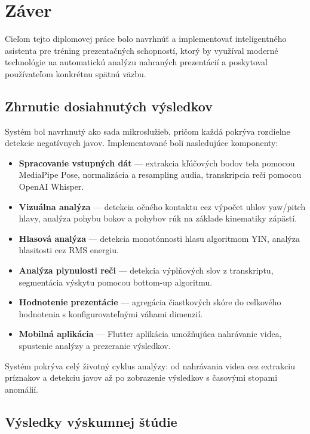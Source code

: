 \chapter{Záver}
\pagestyle{plain}

Cieľom tejto diplomovej práce bolo navrhnúť a implementovať inteligentného asistenta pre tréning prezentačných schopností, ktorý by využíval moderné technológie na automatickú analýzu nahraných prezentácií a poskytoval používateľom konkrétnu spätnú väzbu.

\section{Zhrnutie dosiahnutých výsledkov}

Systém bol navrhnutý ako sada mikroslužieb, pričom každá pokrýva rozdielne detekcie negatívnych javov. Implementované boli nasledujúce komponenty:

\begin{itemize}
    \item \textbf{Spracovanie vstupných dát} --- extrakcia kľúčových bodov tela pomocou MediaPipe Pose, normalizácia a resampling audia, transkripcia reči pomocou OpenAI Whisper.
    \item \textbf{Vizuálna analýza} --- detekcia očného kontaktu cez výpočet uhlov yaw/pitch hlavy, analýza pohybu bokov a pohybov rúk na základe kinematiky zápästí.
    \item \textbf{Hlasová analýza} --- detekcia monotónnosti hlasu algoritmom YIN, analýza hlasitosti cez RMS energiu.
    \item \textbf{Analýza plynulosti reči} --- detekcia výplňových slov z transkriptu, segmentácia výskytu pomocou bottom-up algoritmu.
    \item \textbf{Hodnotenie prezentácie} --- agregácia čiastkových skóre do celkového hodnotenia s konfigurovateľnými váhami dimenzií.
    \item \textbf{Mobilná aplikácia} --- Flutter aplikácia umožňujúca nahrávanie videa, spustenie analýzy a prezeranie výsledkov.
\end{itemize}

Systém pokrýva celý životný cyklus analýzy: od nahrávania videa cez extrakciu príznakov a detekciu javov až po zobrazenie výsledkov s časovými stopami anomálií.

\section{Výsledky výskumnej štúdie}

